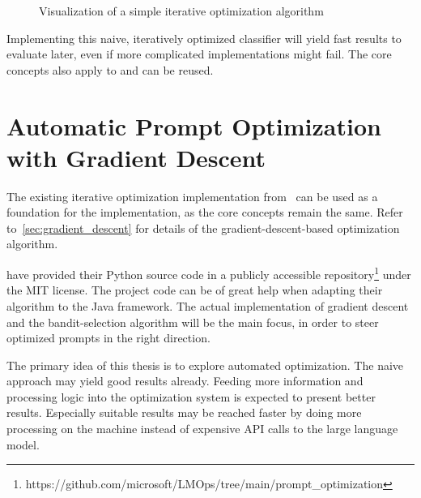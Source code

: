 \begin{figure}
    \centering
    
    \caption{Visualization of a simple iterative optimization algorithm }
    \label{fig:iterative_core_loop}
\end{figure}

Implementing this naive, iteratively optimized classifier will yield fast results to evaluate later, even if more complicated implementations might fail.
The core concepts also apply to  and can be reused.


\section{Automatic Prompt Optimization with Gradient Descent}
\label{approach:sec:gradient_descent}
The existing iterative optimization implementation from~ can be used as a foundation for the implementation, as the core concepts remain the same.
Refer to~\autoref{sec:gradient_descent} for details of the gradient-descent-based optimization algorithm.

 have provided their Python source code in a publicly accessible repository\footnote{https://github.com/microsoft/LMOps/tree/main/prompt\_optimization} under the MIT license.
The project code can be of great help when adapting their algorithm to the \LiSSA Java framework.
The actual implementation of gradient descent and the bandit-selection algorithm will be the main focus, in order to steer optimized prompts in the right direction.

The primary idea of this thesis is to explore automated optimization.
The naive approach may yield good results already.
Feeding more information and processing logic into the optimization system is expected to present better results.
Especially suitable results may be reached faster by doing more processing on the machine instead of expensive API calls to the large language model.